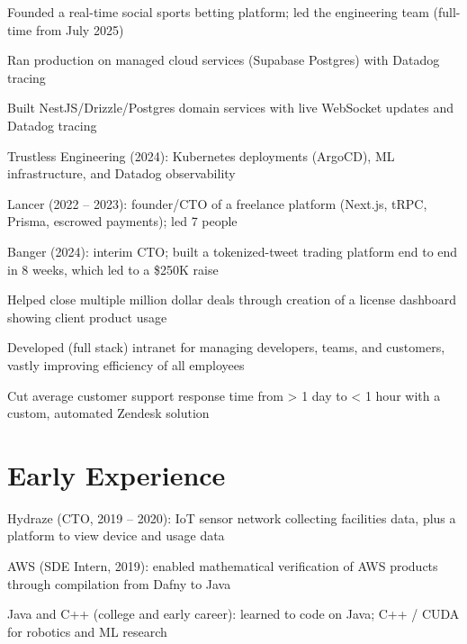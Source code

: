 \documentclass[print]{jack-resume}
\begin{document}
\begin{tightemize}
    \item Founded a real-time social sports betting platform; led the engineering team (full-time from July 2025)
    \item Ran production on managed cloud services (Supabase Postgres) with Datadog tracing
    \item Built NestJS/Drizzle/Postgres domain services with live WebSocket updates and Datadog tracing
\end{tightemize}
\sectionsep

\begin{tightemize}
    \item Trustless Engineering (2024): Kubernetes deployments (ArgoCD), ML infrastructure, and Datadog observability
    \item Lancer (2022 -- 2023): founder/CTO of a freelance platform (Next.js, tRPC, Prisma, escrowed payments); led 7 people
    \item Banger (2024): interim CTO; built a tokenized-tweet trading platform end to end in 8 weeks, which led to a \$250K raise
\end{tightemize}
\sectionsep

\begin{tightemize}
    \item Helped close multiple million dollar deals through creation of a license dashboard showing client product usage
    \item Developed (full stack) intranet for managing developers, teams, and customers, vastly improving efficiency of all employees
    \item Cut average customer support response time from > 1 day to < 1 hour with a custom, automated Zendesk solution
\end{tightemize}
\sectionsep

\section{Early Experience}
\vspace{1.4em}
\begin{tightemize}
    \item Hydraze (CTO, 2019 -- 2020): IoT sensor network collecting facilities data, plus a platform to view device and usage data
    \item AWS (SDE Intern, 2019): enabled mathematical verification of AWS products through compilation from Dafny to Java
    \item Java and C++ (college and early career): learned to code on Java; C++ / CUDA for robotics and ML research
\end{tightemize}
\sectionsep
\end{document}
